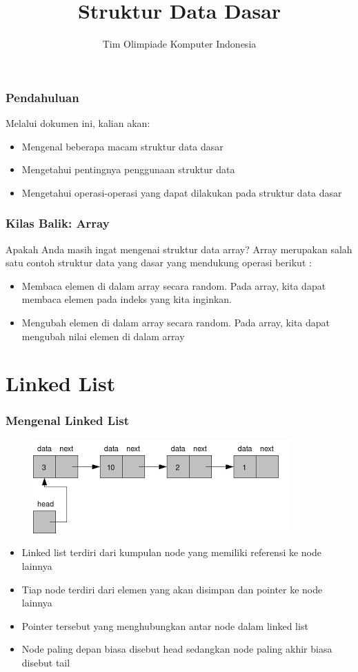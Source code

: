 

\title{Struktur Data Dasar}
\author{Tim Olimpiade Komputer Indonesia}
\date{}



\begin{frame}
\titlepage
\end{frame}

\begin{frame}
\frametitle{Pendahuluan}
Melalui dokumen ini, kalian akan:
\begin{itemize}
  \item Mengenal beberapa macam struktur data dasar
  \item Mengetahui pentingnya penggunaan struktur data
  \item Mengetahui operasi-operasi yang dapat dilakukan pada struktur data dasar
\end{itemize}
\end{frame}

\begin{frame}
\frametitle{Kilas Balik: Array}
Apakah Anda masih ingat mengenai struktur data array?
Array merupakan salah satu contoh struktur data yang dasar yang mendukung operasi berikut :
\begin{itemize}
  \item Membaca elemen di dalam array secara random. Pada array, kita dapat membaca elemen pada indeks yang kita inginkan.
  \item Mengubah elemen di dalam array secara random. Pada array, kita dapat mengubah nilai elemen di dalam array
\end{itemize} 
\end{frame}

\section{Linked List}
\frame{\sectionpage}

\begin{frame}
\frametitle{Mengenal Linked List}
\begin{figure}
  \centering
  \includegraphics[width=6 cm]{asset/linkedlist.png}
\end{figure}
\begin{itemize}
  \item Linked list terdiri dari kumpulan \alert{node} yang memiliki referensi ke node lainnya
  \item Tiap node terdiri dari elemen yang akan disimpan dan \alert{pointer} ke node lainnya
  \item Pointer tersebut yang menghubungkan antar node dalam linked list
  \item Node paling depan biasa disebut \alert{head} sedangkan node paling akhir biasa disebut \alert{tail}
\end{itemize}
\end{frame}

